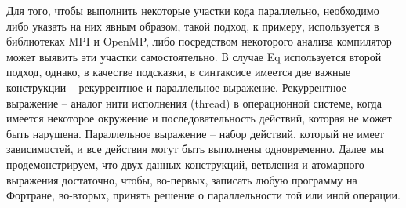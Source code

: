 \documentclass[a4paper]{llncs}
\begin{document}
Для того, чтобы выполнить некоторые участки кода параллельно, необходимо 
либо указать на них явным образом, такой подход, к примеру, используется в 
библиотеках MPI и OpenMP, либо посредством некоторого анализа компилятор может 
выявить эти участки самостоятельно.  В случае Eq используется второй подход, 
однако, в качестве подсказки, в синтаксисе имеется две важные конструкции --
рекуррентное и параллельное выражение.  Рекуррентное выражение -- аналог нити 
исполнения (thread) в операционной системе, когда имеется некоторое окружение 
и последовательность действий, которая не может быть нарушена.  Параллельное 
выражение -- набор действий, который не имеет  зависимостей, и все действия 
могут быть выполнены одновременно.  Далее мы продемонстрируем, что двух данных 
конструкций, ветвления и атомарного выражения достаточно, чтобы, во-первых, 
записать любую программу на Фортране, во-вторых, принять решение о 
параллельности той или иной операции.
\end{document}
